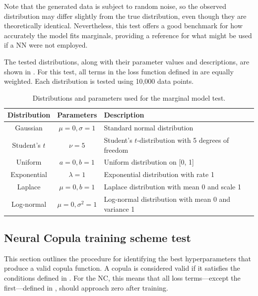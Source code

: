 Note that the generated data is subject to random noise, so the observed distribution may differ slightly from the true distribution, even though they are theoretically identical. Nevertheless, this test offers a good benchmark for how accurately the model fits marginals, providing a reference for what might be used if a \gls{NN} were not employed.

The tested distributions, along with their parameter values and descriptions, are shown in . For this test, all terms in the loss function defined in  are equally weighted. Each distribution is tested using 10,000 data points.

\begin{table}[h]
    \centering
    \caption{Distributions and parameters used for the marginal model test.}
    \begin{tabular}{@{}ccl@{}}
        Distribution & Parameters & Description \\
        \toprule
        Gaussian & $\mu=0, \sigma=1$ & Standard normal distribution \\ 
        Student's $t$ & $\nu=5$ & Student's $t$-distribution with 5 degrees of freedom \\ 
        Uniform & $a=0, b=1$ & Uniform distribution on [0, 1] \\ 
        Exponential & $\lambda=1$ & Exponential distribution with rate 1 \\ 
        Laplace & $\mu=0, b=1$ & Laplace distribution with mean 0 and scale 1 \\ 
        Log-normal & $\mu=0, \sigma^2=1$ & Log-normal distribution with mean 0 and variance 1 \\ 
    \end{tabular}
    \label{tab:distributions}
\end{table}


\subsection{Neural Copula training scheme test}
This section outlines the procedure for identifying the best hyperparameters that produce a valid copula function. A copula is considered valid if it satisfies the conditions defined in . For the \gls{NC}, this means that all loss terms—except the first—defined in , should approach zero after training.

